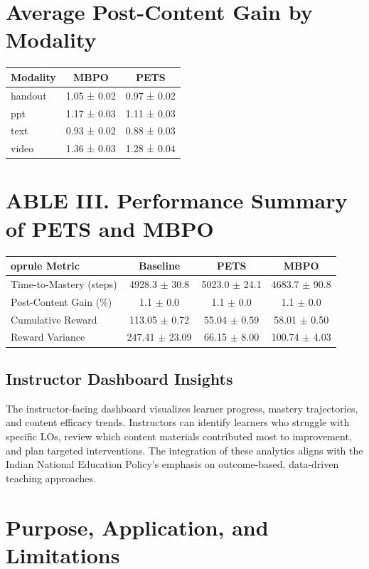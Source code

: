 \documentclass[preprint,12pt]{elsarticle}
\begin{document}
\begin{frontmatter}
\section*{Average Post-Content Gain by Modality}
\begin{tabular}{lcc}
\toprule
Modality & MBPO & PETS \\ 
\midrule
handout & 1.05 ± 0.02 & 0.97 ± 0.02 \\ 
ppt & 1.17 ± 0.03 & 1.11 ± 0.03 \\ 
text & 0.93 ± 0.02 & 0.88 ± 0.03 \\ 
video & 1.36 ± 0.03 & 1.28 ± 0.04 \\ 
\bottomrule
\end{tabular}


\section*{ABLE III. Performance Summary of PETS and MBPO}
\begin{tabular}{lccc}
	oprule
Metric & Baseline & PETS & MBPO \\
\midrule
Time-to-Mastery (steps) & 4928.3 $\pm$ 30.8 & 5023.0 $\pm$ 24.1 & 4683.7 $\pm$ 90.8 \\
Post-Content Gain (\%) & 1.1 $\pm$ 0.0 & 1.1 $\pm$ 0.0 & 1.1 $\pm$ 0.0 \\
Cumulative Reward & 113.05 $\pm$ 0.72 & 55.04 $\pm$ 0.59 & 58.01 $\pm$ 0.50 \\
Reward Variance & 247.41 $\pm$ 23.09 & 66.15 $\pm$ 8.00 & 100.74 $\pm$ 4.03 \\
\bottomrule
\end{tabular}

\subsection{Instructor Dashboard Insights}
The instructor-facing dashboard visualizes learner progress, mastery trajectories, and content efficacy trends. Instructors can identify learners who struggle with specific LOs, review which content materials contributed most to improvement, and plan targeted interventions. The integration of these analytics aligns with the Indian National Education Policy’s emphasis on outcome-based, data-driven teaching approaches.
\section{Purpose, Application, and Limitations}


\end{frontmatter}
\end{document}
